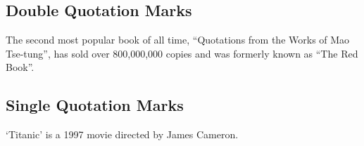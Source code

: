\documentclass{book}
\begin{document}
\subsection*{Double Quotation Marks}
The second most popular book of all time, ``Quotations from the Works of Mao Tse-tung'', has sold over 800,000,000 copies and was formerly known as ``The Red Book''.

\subsection*{Single Quotation Marks}
`Titanic' is a 1997 movie directed by James Cameron.
\end{document}
